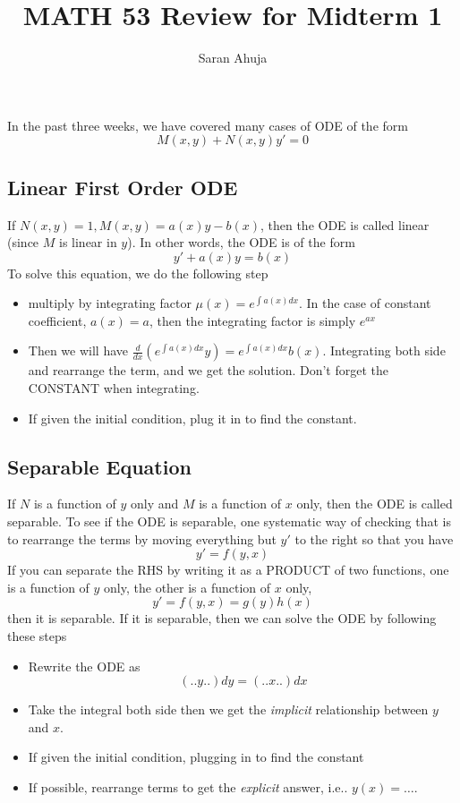 \documentclass[10pt]{amsart}
\title{MATH 53 Review for Midterm 1}
\author{Saran Ahuja}
\newcommand{\bi}{\begin{itemize}}
\newcommand{\ei}{\end{itemize}}
\renewcommand{\ni}{\noindent}
\begin{document}
\maketitle

\ni In the past three weeks, we have covered many cases of ODE of the form
$$ M(x,y)+N(x,y)y' = 0 $$
\vspace{0.2in}
\subsection*{Linear First Order ODE}
If $N(x,y)=1, M(x,y) = a(x)y-b(x)$, then the ODE is called linear (since $M$ is linear in $y$). In other words, the ODE is of the form
$$ y' + a(x)y = b(x) $$
To solve this equation, we do the following step
\bi
\item multiply by integrating factor $\mu(x) = e^{\int a(x) dx}$. In the case of constant coefficient, $a(x) = a$, then the integrating factor is simply $e^{ax}$
\item Then we will have $\frac{d}{dx}(e^{\int a(x)dx}y) = e^{\int a(x)dx} b(x) $. Integrating both side and rearrange the term, and we get the solution. Don't forget the CONSTANT when integrating.
\item If given the initial condition, plug it in to find the constant.
\ei

\vspace{0.2in}
\subsection*{Separable Equation}
If  $N$ is a function of $y$ only and $M$ is a function of $x$ only, then the ODE is called separable. To see if the ODE is separable, one systematic way of checking that is to rearrange the terms by moving everything but $y'$ to the right so that you have
$$ y' = f(y,x)$$
If you can separate the RHS by writing it as a PRODUCT of two functions, one is a function of $y$ only, the other is a function of $x$ only, 
$$ y' = f(y,x) = g(y)h(x) $$
then it is separable. If it is separable, then we can solve the ODE by following these steps
\bi
\item Rewrite the ODE as 
$$  ( .. y .. )dy = (.. x .. )dx $$
\item Take the integral both side then we get the \textit{implicit} relationship between $y$ and $x$. 
\item If given the initial condition, plugging in to find the constant
\item If possible, rearrange terms to get the \textit{explicit} answer, i.e.. $y(x) = \dots$. 
\ei
\end{document}
